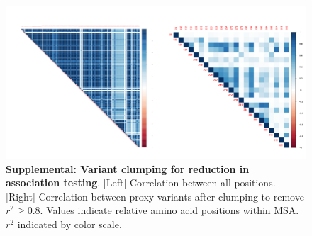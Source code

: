 \documentclass{article} %
\begin{document}
\begin{figure}[ht] \hspace{-0.5cm} 
    \includegraphics[scale=0.85]{S1}
	\caption{\textbf{Supplemental: Variant clumping for reduction in association testing}. [Left] Correlation between all positions. [Right] Correlation between proxy variants after clumping to remove $r^2 \ge 0.8$. Values indicate relative amino acid positions within MSA. $r^2$ indicated by color scale.}
	\label{fig:clumping}
\end{figure}
\end{document}
